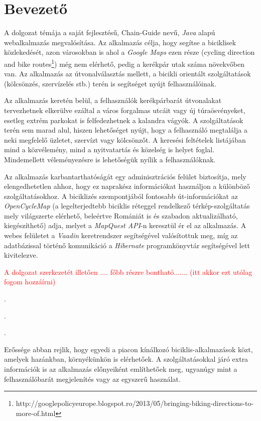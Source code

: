 \chapter{Bevezető}\label{ch:BEVEZET}


\setlength{\parindent}{4em}
\setlength{\parskip}{1em}

 \par	A dolgozat témája a saját fejlesztésű,  Chain-Guide nevű,   \textit{Java} alapú webalkalmazás megvalósítása. Az alkalmazás célja, hogy segítse a biciklisek közlekedését, azon városokban is ahol a  \textit{Google Maps} ezen része  (cycling direction and bike routes\footnote{http://googlepolicyeurope.blogspot.ro/2013/05/bringing-biking-directions-to-more-of.html}) még nem elérhető, pedig a kerékpár utak száma növekvőben van. Az alkalmazás az útvonalválasztás mellett, a bicikli orientált szolgáltatások (kölcsönzés, szervízelés stb.) terén is segítséget nyújt felhasználóinak. 
 \par	Az alkalmazás keretén belül, a felhasználók kerékpárbarát útvonalakat tervezhetnek elkerülve ezáltal a város forgalmas utcáit vagy  új túraösvényeket, esetleg extrém parkokat is felfedezhetnek a kalandra vágyók. A szolgáltatások terén sem marad alul, hiszen lehetőséget nyújt, hogy a felhasználó megtalálja a neki megfelelő üzletet, szervízt vagy kölcsönzőt. A keresési feltételek listájában mind a közvélemény, mind a nyitvatartás és közelség is helyet foglal. Mindemellett véleményezésre is lehetőségük nyílik a felhasználóknak. 
 \par	Az alkalmazás  karbantarthatóságát egy adminisztrációs felület biztosítja, mely elengedhetetlen ahhoz, hogy ez naprakész információkat használjon a különböző szolgáltatásokhoz. A biciklizés szempontjából fontosabb út-információkat az  \textit{OpenCycleMap}\cite{OpenCycleMap} (a legelterjedtebb biciklis réteggel rendelkező térkép-szolgáltatás mely világszerte elérhető, beleértve Romániát is és szabadon aktualizálható, kiegészíthető) adja, melyet a  \textit{MapQuest API}\cite{MapQuestJsApi}-n keresztül ér el az alkalmazás. A webes felületet a  \textit{Vaadin}\cite{Vaadin}  keretrendszer segítségével valósítottuk meg, míg az adatbázissal történő komunikáció a  \textit{Hibernate}\cite{Hibernate} programkönyvtár segítségével lett kivitelezve. 
 \par	\textcolor{red}{A dolgozat szerkezetét illetően .... főbb részre bontható.......
		(itt akkor ezt utólag fogom hozzáírni)}
\par .
\par.
\par .





 \par	Erőssége abban rejlik, hogy egyedi a piacon kínálkozó biciklis-alkalmazások közt, amelyek hazánkban, környékünkön is elérhetőek. A szolgáltatásokkal járó extra információk is az alkalmazás előnyeiként említhetőek meg, ugyanúgy mint a felhasználóbarát megjelenítés vagy az egyszerű használat. 

